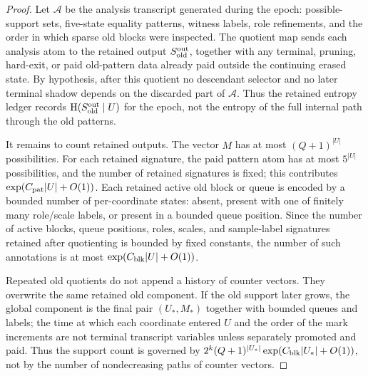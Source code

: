 \documentclass[11pt]{article}
\theoremstyle{remark}
\newcommand{\HH}{\mathrm H}
\newcommand{\old}{\mathrm{old}}
\begin{document}
\begin{proof}
Let $\mathcal A$ be the analysis transcript generated during the epoch: possible-support sets, five-state equality patterns, witness labels, role refinements, and the order in which sparse old blocks were inspected.  The quotient map sends each analysis atom to the retained output $S_{\old}^{\rm out}$, together with any terminal, pruning, hard-exit, or paid old-pattern data already paid outside the continuing erased state.  By hypothesis, after this quotient no descendant selector and no later terminal shadow depends on the discarded part of $\mathcal A$.  Thus the retained entropy ledger records $\HH(S_{\old}^{\rm out}\mid U)$ for the epoch, not the entropy of the full internal path through the old patterns.

It remains to count retained outputs.  The vector $M$ has at most $(Q+1)^{|U|}$ possibilities.  For each retained signature, the paid pattern atom has at most $5^{|U|}$ possibilities, and the number of retained signatures is fixed; this contributes $\exp(C_{\rm pat}|U|+O(1))$.  Each retained active old block or queue is encoded by a bounded number of per-coordinate states: absent, present with one of finitely many role/scale labels, or present in a bounded queue position.  Since the number of active blocks, queue positions, roles, scales, and sample-label signatures retained after quotienting is bounded by fixed constants, the number of such annotations is at most $\exp(C_{\rm blk}|U|+O(1))$.

Repeated old quotients do not append a history of counter vectors.  They overwrite the same retained old component.  If the old support later grows, the global component is the final pair $(U_*,M_*)$ together with bounded queues and labels; the time at which each coordinate entered $U$ and the order of the mark increments are not terminal transcript variables unless separately promoted and paid.  Thus the support count is governed by $2^k(Q+1)^{|U_*|}\exp(C_{\rm blk}|U_*|+O(1))$, not by the number of nondecreasing paths of counter vectors.
\end{proof}
\end{document}
